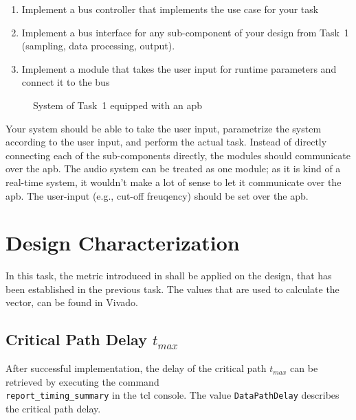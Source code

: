 \documentclass[%
	a4paper,
]
{article}
\begin{document}
\begin{enumerate}

	\item{Implement a bus controller that implements the use case for your
		task}

	\item{Implement a bus interface for any sub-component of your design
		from Task~1 (sampling, data processing, output).}

	\item{Implement a module that takes the user input for runtime parameters
		and connect it to the bus}

\end{enumerate}

\begin{figure}[h!]
	\centering
	
	\caption{System of Task~1 equipped with an \gls{apb}}
	\label{fig:audio-block}
\end{figure}

Your system should be able to take the user input, parametrize the system
according to the user input, and perform the actual task. Instead of
directly connecting each of the sub-components directly, the modules should
communicate over the \gls{apb}. The audio system can be treated as one
module; as it is kind of a real-time system, it wouldn't make a lot of sense
to let it communicate over the \gls{apb}. The user-input (e.g., cut-off
freuqency) should be set over the \gls{apb}.

\pagebreak


\section{Design Characterization}
\label{sec:task1}
In this task, the metric introduced in  shall be applied on the design, that has been established in the previous task. The values that are used to calculate the vector, can be found in Vivado. 

\subsection*{Critical Path Delay $t_{max}$}
After successful implementation, the delay of the critical path $t_{max}$ can be retrieved by executing the command \\ \lstinline[breaklines=true]{report_timing_summary} in the tcl console. The value \lstinline{DataPathDelay} describes the critical path delay.
\end{document}
